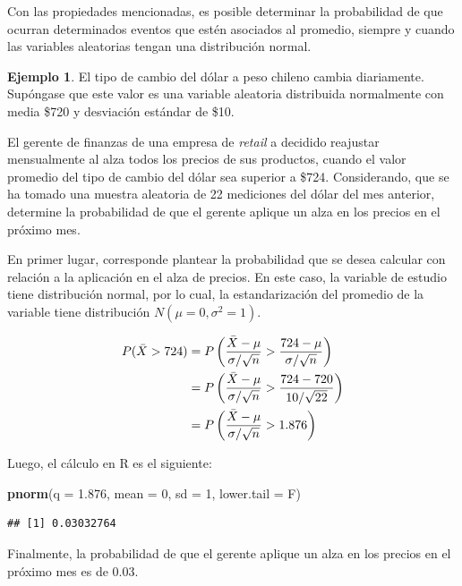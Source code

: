 \documentclass[
  11pt,
]{book}
\newenvironment{Shaded}{\begin{snugshade}}{\end{snugshade}}
\newcommand{\AttributeTok}[1]{\textcolor[rgb]{0.13,0.29,0.53}{#1}}
\newcommand{\DecValTok}[1]{\textcolor[rgb]{0.00,0.00,0.81}{#1}}
\newcommand{\FloatTok}[1]{\textcolor[rgb]{0.00,0.00,0.81}{#1}}
\newcommand{\FunctionTok}[1]{\textcolor[rgb]{0.13,0.29,0.53}{\textbf{#1}}}
\newcommand{\NormalTok}[1]{#1}
\theoremstyle{definition}
\theoremstyle{definition}
\newtheorem{example}{Ejemplo}[chapter]
\theoremstyle{definition}
\theoremstyle{definition}
\theoremstyle{remark}
\begin{document}
Con las propiedades mencionadas, es posible determinar la probabilidad de que ocurran determinados eventos que estén asociados al promedio, siempre y cuando las variables aleatorias tengan una distribución normal.

\begin{example}
\protect\hypertarget{exm:media1}{}\label{exm:media1}El tipo de cambio del dólar a peso chileno cambia diariamente. Supóngase que este valor es una variable aleatoria distribuida normalmente con media \$720 y desviación estándar de \$10.

El gerente de finanzas de una empresa de \emph{retail} a decidido reajustar mensualmente al alza todos los precios de sus productos, cuando el valor promedio del tipo de cambio del dólar sea superior a \$724. Considerando, que se ha tomado una muestra aleatoria de 22 mediciones del dólar del mes anterior, determine la probabilidad de que el gerente aplique un alza en los precios en el próximo mes.

En primer lugar, corresponde plantear la probabilidad que se desea calcular con relación a la aplicación en el alza de precios. En este caso, la variable de estudio tiene distribución normal, por lo cual, la estandarización del promedio de la variable tiene distribución \(N(\mu = 0, \sigma^2=1)\).

\begin{equation}
\notag
\begin{split}
P(\bar{X} > 724) &= P\left(\frac{\bar{X}-\mu}{\sigma/\sqrt{n}} > \frac{724-\mu}{\sigma/\sqrt{n}}\right)\\
&= P\left(\frac{\bar{X}-\mu}{\sigma/\sqrt{n}}  > \frac{724-720}{10/\sqrt{22}}\right)\\
&= P\left(\frac{\bar{X}-\mu}{\sigma/\sqrt{n}}  > 1.876\right)\\
\end{split}
\end{equation}

Luego, el cálculo en R es el siguiente:

\begin{Shaded}
\begin{Highlighting}[]
\FunctionTok{pnorm}\NormalTok{(}\AttributeTok{q =} \FloatTok{1.876}\NormalTok{, }\AttributeTok{mean =} \DecValTok{0}\NormalTok{, }\AttributeTok{sd =} \DecValTok{1}\NormalTok{, }\AttributeTok{lower.tail =}\NormalTok{ F)}
\end{Highlighting}
\end{Shaded}

\begin{verbatim}
## [1] 0.03032764
\end{verbatim}

Finalmente, la probabilidad de que el gerente aplique un alza en los precios en el próximo mes es de 0.03.
\end{example}
\end{document}
